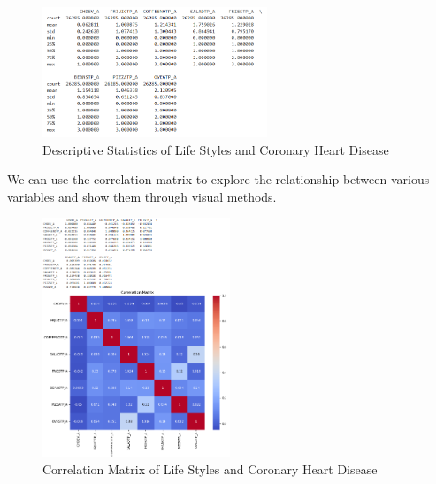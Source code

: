 \documentclass{article}
\begin{document}
\begin{figure}[!h]
	\centering
	\includegraphics[width=0.6\textwidth]{../Image/P1.jpg}
	\caption{Descriptive Statistics of Life Styles and Coronary Heart Disease}
	\label{fig:P1}
\end{figure}

We can use the correlation matrix to explore the relationship between various variables and show them through visual methods.

\begin{figure}[!h]
	\centering
	\includegraphics[width=0.5\textwidth]{../Image/P2.jpg}
	\caption{Correlation Matrix of Life Styles and Coronary Heart Disease}
	\label{fig:P2}
\end{figure}


\end{document}
